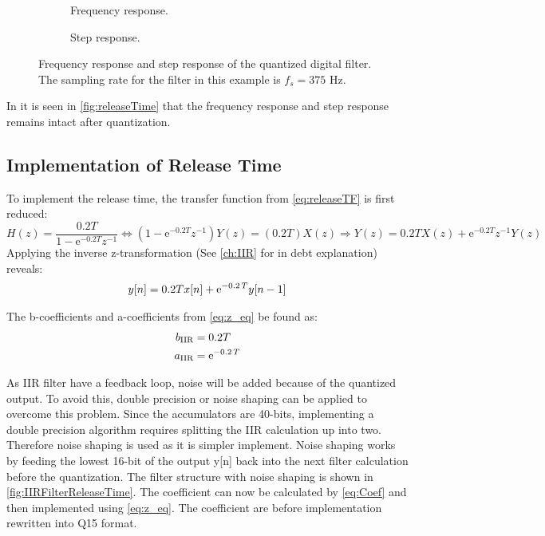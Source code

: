 \begin{figure}[H]
\centering
\begin{subfigure}[t]{0.7\textwidth}
	
	\caption{Frequency response.}
	\label{fig:releaseTimeDigitalFreq}
\end{subfigure}
\begin{subfigure}[t]{0.7\textwidth}
	
	\caption{Step response.}
	\label{fig:releaseTimeDigitalStep}
\end{subfigure}
\caption{Frequency response and step response of the quantized digital filter. The sampling rate for the filter in this example is $f_s = 375$ Hz.}
\label{fig:releaseTime}
\end{figure}

In it is seen in \autoref{fig:releaseTime} that the frequency response and step response remains intact after quantization.

\subsection*{Implementation of Release Time}

To implement the release time, the transfer function from \autoref{eq:releaseTF} is first reduced:
\begin{equation}
H(z) = \frac{0.2T}{1-\text{e}^{-0.2T} z^{-1}}  \Leftrightarrow (1-\text{e}^{-0.2T} z^{-1})Y(z) = (0.2T)X(z) \Rightarrow Y(z) = 0.2TX(z) + \text{e}^{-0.2T} z^{-1}Y(z)
\end{equation}
Applying the inverse z-transformation (See \autoref{ch:IIR} for in debt explanation) reveals:
\begin{align}
y[n] = 0.2Tx[n] + {\rm e}^{- 0.2\,T}y[n-1]
\label{eq:z_eq}
\end{align}

The b-coefficients and a-coefficients from \autoref{eq:z_eq} be found as:
\begin{align}
b_{\text{IIR}} &= 0.2T \\
a_{\text{IIR}} &= {\rm e}^{- 0.2\,T}
\label{eq:Coef}
\end{align}

As IIR filter have a feedback loop, noise will be added because of the quantized output. To avoid this, double precision or noise shaping can be applied to overcome this problem. Since the accumulators are 40-bits, implementing a double precision algorithm requires splitting the IIR calculation up into two. Therefore noise shaping is used as it is simpler implement. Noise shaping works by feeding the lowest 16-bit of the output y[n] back into the next filter calculation before the quantization. The filter structure with noise shaping is shown in \autoref{fig:IIRFilterReleaseTime}. The coefficient can now be calculated by \autoref{eq:Coef} and then implemented using \autoref{eq:z_eq}. The coefficient are before implementation rewritten into Q15 format.

